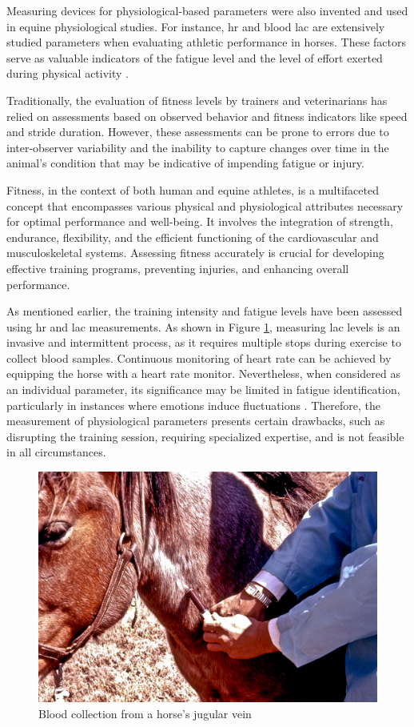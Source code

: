 Measuring devices for physiological-based parameters were also invented and used in equine physiological studies. For instance, \gls{hr} and blood \gls{lac} are extensively studied parameters when evaluating athletic performance in horses. These factors serve as valuable indicators of the fatigue level and the level of effort exerted during physical activity \cite{sloet, Arfuso2021PeripheralHorses}.

Traditionally, the evaluation of fitness levels by trainers and veterinarians has relied on assessments based on observed behavior and fitness indicators like speed and stride duration. However, these assessments can be prone to errors due to inter-observer variability and the inability to capture changes over time in the animal's condition that may be indicative of impending fatigue or injury.

Fitness, in the context of both human and equine athletes, is a multifaceted concept that encompasses various physical and physiological attributes necessary for optimal performance and well-being. It involves the integration of strength, endurance, flexibility, and the efficient functioning of the cardiovascular and musculoskeletal systems. Assessing fitness accurately is crucial for developing effective training programs, preventing injuries, and enhancing overall performance.

As mentioned earlier, the training intensity and fatigue levels have been assessed using \gls{hr} and \gls{lac} measurements. As shown in Figure \ref{invasive}, measuring \gls{lac} levels is an invasive and intermittent process, as it requires multiple stops during exercise to collect blood samples. Continuous monitoring of heart rate can be achieved by equipping the horse with a heart rate monitor. Nevertheless, when considered as an individual parameter, its significance may be limited in fatigue identification, particularly in instances where emotions induce fluctuations \cite{JANSEN200938}. Therefore, the measurement of physiological parameters presents certain drawbacks, such as disrupting the training session, requiring specialized expertise, and is not feasible in all circumstances.

\begin{figure}[htbp]
\centering
\includegraphics[width=.6\linewidth]{../tables/Blood_collection_from_horse.jpg}
\caption{Blood collection from a horse's jugular vein}
\label{invasive}
\end{figure}

